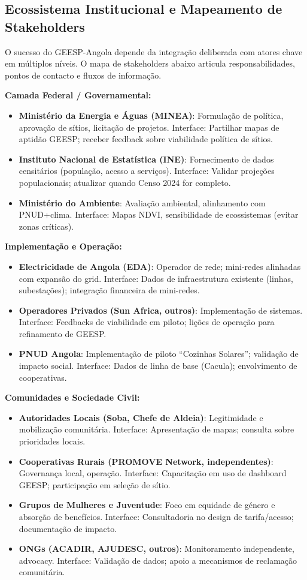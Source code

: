 \documentclass[12pt, a4paper]{article}
\begin{document}
\begin{itemize}
\subsection{Ecossistema Institucional e Mapeamento de Stakeholders}

O sucesso do GEESP-Angola depende da integração deliberada com atores chave em múltiplos níveis. O mapa de stakeholders abaixo articula responsabilidades, pontos de contacto e fluxos de informação.

\textbf{Camada Federal / Governamental:}
\begin{itemize}
\item \textbf{Ministério da Energia e Águas (MINEA)}: Formulação de política, aprovação de sítios, licitação de projetos. Interface: Partilhar mapas de aptidão GEESP; receber feedback sobre viabilidade política de sítios.
\item \textbf{Instituto Nacional de Estatística (INE)}: Fornecimento de dados censitários (população, acesso a serviços). Interface: Validar projeções populacionais; atualizar quando Censo 2024 for completo.
\item \textbf{Ministério do Ambiente}: Avaliação ambiental, alinhamento com PNUD+clima. Interface: Mapas NDVI, sensibilidade de ecossistemas (evitar zonas críticas).
\end{itemize}

\textbf{Implementação e Operação:}
\begin{itemize}
\item \textbf{Electricidade de Angola (EDA)}: Operador de rede; mini-redes alinhadas com expansão do grid. Interface: Dados de infraestrutura existente (linhas, subestações); integração financeira de mini-redes.
\item \textbf{Operadores Privados (Sun Africa, outros)}: Implementação de sistemas. Interface: Feedbacks de viabilidade em piloto; lições de operação para refinamento de GEESP.
\item \textbf{PNUD Angola}: Implementação de piloto ``Cozinhas Solares''; validação de impacto social. Interface: Dados de linha de base (Cacula); envolvimento de cooperativas.
\end{itemize}

\textbf{Comunidades e Sociedade Civil:}
\begin{itemize}
\item \textbf{Autoridades Locais (Soba, Chefe de Aldeia)}: Legitimidade e mobilização comunitária. Interface: Apresentação de mapas; consulta sobre prioridades locais.
\item \textbf{Cooperativas Rurais (PROMOVE Network, independentes)}: Governança local, operação. Interface: Capacitação em uso de dashboard GEESP; participação em seleção de sítio.
\item \textbf{Grupos de Mulheres e Juventude}: Foco em equidade de género e absorção de benefícios. Interface: Consultadoria no design de tarifa/acesso; documentação de impacto.
\item \textbf{ONGs (ACADIR, AJUDESC, outros)}: Monitoramento independente, advocacy. Interface: Validação de dados; apoio a mecanismos de reclamação comunitária.
\end{itemize}


\end{itemize}
\end{document}

